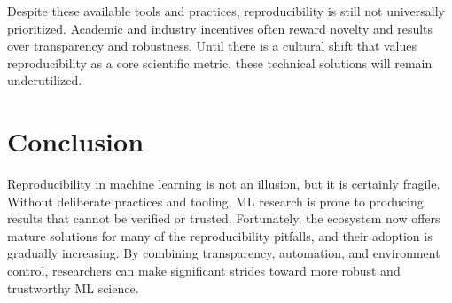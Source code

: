 \documentclass[11pt]{article}
\begin{document}
Despite these available tools and practices, reproducibility is still not universally prioritized. Academic and industry incentives often reward novelty and results over transparency and robustness. Until there is a cultural shift that values reproducibility as a core scientific metric, these technical solutions will remain underutilized.


\section{Conclusion}
\label{sec:conclusion}
Reproducibility in machine learning is not an illusion, but it is certainly fragile. Without deliberate practices and tooling, ML research is prone to producing results that cannot be verified or trusted. Fortunately, the ecosystem now offers mature solutions for many of the reproducibility pitfalls, and their adoption is gradually increasing. By combining transparency, automation, and environment control, researchers can make significant strides toward more robust and trustworthy ML science.

% 

\end{document}
